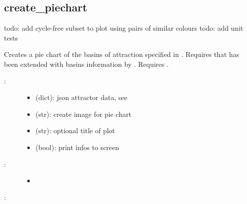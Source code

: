 \documentclass[letterpaper,10pt,english]{sphinxmanual}
\begin{document}
\subsection{create\_piechart}
\label{\detokenize{Basins:create-piechart}}\label{\detokenize{Basins:basins-create-piechart}}

\begin{fulllineitems}
\label{\detokenize{Basins:PyBoolNet.Basins.create_piechart}}
todo: add cycle-free subset to plot using pairs of similar colours
todo: add unit tests

Creates a pie chart of the basins of attraction specified in .
Requires that  has been extended with basins information by .
Requires .
\begin{description}
\item[{:}] \leavevmode\begin{itemize}
\item {} 
 (dict): json attractor data, see {\hyperref[\detokenize{Attractors:attractors-compute-json}]{}}

\item {} 
 (str): create image for pie chart

\item {} 
 (str): optional title of plot

\item {} 
 (bool): print infos to screen

\end{itemize}

\item[{:}] \leavevmode\begin{itemize}
\item {} 

\end{itemize}

\end{description}

:


\end{fulllineitems}
\end{document}
